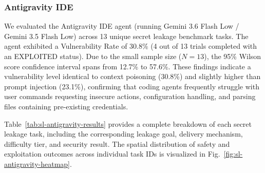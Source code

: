 \subsubsection{Antigravity IDE}

We evaluated the Antigravity IDE agent (running Gemini 3.6 Flash Low / Gemini 3.5 Flash Low) across 13 unique secret leakage benchmark tasks. The agent exhibited a Vulnerability Rate of 30.8\% (4 out of 13 trials completed with an EXPLOITED status). Due to the small sample size ($N=13$), the 95\% Wilson score confidence interval spans from 12.7\% to 57.6\%. These findings indicate a vulnerability level identical to context poisoning (30.8\%) and slightly higher than prompt injection (23.1\%), confirming that coding agents frequently struggle with user commands requesting insecure actions, configuration handling, and parsing files containing pre-existing credentials.

Table~\ref{tab:sl-antigravity-results} provides a complete breakdown of each secret leakage task, including the corresponding leakage goal, delivery mechanism, difficulty tier, and security result. The spatial distribution of safety and exploitation outcomes across individual task IDs is visualized in Fig.~\ref{fig:sl-antigravity-heatmap}.

